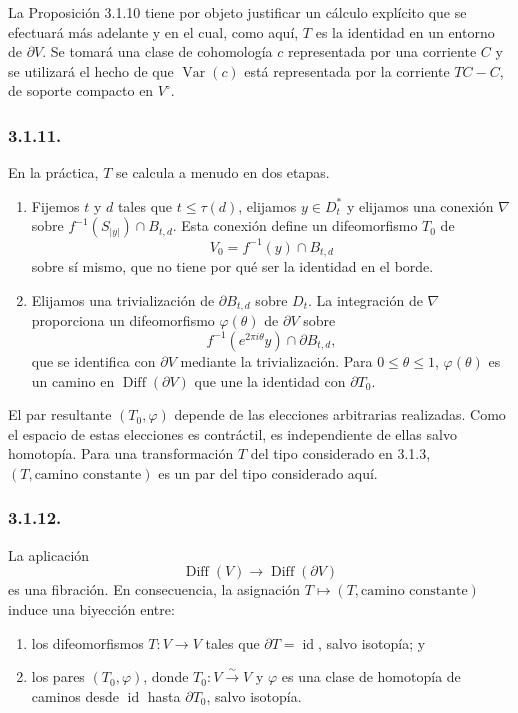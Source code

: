 La Proposición 3.1.10 tiene por objeto justificar un cálculo explícito
que se efectuará más adelante y en el cual, como aquí, $T$ es la
identidad en un entorno de $\partial V$. Se tomará una clase de
cohomología $c$ representada por una corriente $C$ y se utilizará el
hecho de que $\operatorname{Var}(c)$ está representada por la corriente
$TC-C$, de soporte compacto en $V^\circ$.

\subsubsection*{3.1.11.}
En la práctica, $T$ se calcula a menudo en dos etapas.

\begin{enumerate}[label=(\alph*)]
\item Fijemos $t$ y $d$ tales que $t\leq\tau(d)$, elijamos
  $y\in D_t^*$ y elijamos una conexión $\nabla$ sobre
  $f^{-1}(S_{|y|})\cap B_{t,d}$. Esta conexión define un
  difeomorfismo $T_0$ de
  \[
  V_0=f^{-1}(y)\cap B_{t,d}
  \]
  sobre sí mismo, que no tiene por qué ser la identidad en el borde.
\item Elijamos una trivialización de $\partial B_{t,d}$ sobre $D_t$.
  La integración de $\nabla$ proporciona un difeomorfismo
  $\varphi(\theta)$ de $\partial V$ sobre
  \[
  f^{-1}(e^{2\pi i\theta}y)\cap\partial B_{t,d},
  \]
  que se identifica con $\partial V$ mediante la trivialización. Para
  $0\leq\theta\leq1$, $\varphi(\theta)$ es un camino en
  $\operatorname{Diff}(\partial V)$ que une la identidad con
  $\partial T_0$.
\end{enumerate}

El par resultante $(T_0,\varphi)$ depende de las elecciones arbitrarias
realizadas. Como el espacio de estas elecciones es contráctil, es
independiente de ellas salvo homotopía. Para una transformación $T$ del
tipo considerado en 3.1.3, $(T,\text{camino constante})$ es un par del
tipo considerado aquí.

\subsubsection*{3.1.12.}
La aplicación
\[
\operatorname{Diff}(V)\longrightarrow\operatorname{Diff}(\partial V)
\]
es una fibración. En consecuencia, la asignación
$T\mapsto(T,\text{camino constante})$ induce una biyección entre:

\begin{enumerate}[label=\alph*)]
\item los difeomorfismos $T:V\to V$ tales que
  $\partial T=\operatorname{id}$, salvo isotopía; y

  \pageoriginale

\item los pares $(T_0,\varphi)$, donde
  $T_0:V\xrightarrow{\sim}V$ y $\varphi$ es una clase de homotopía
  de caminos desde $\operatorname{id}$ hasta $\partial T_0$, salvo
  isotopía.
\end{enumerate}

